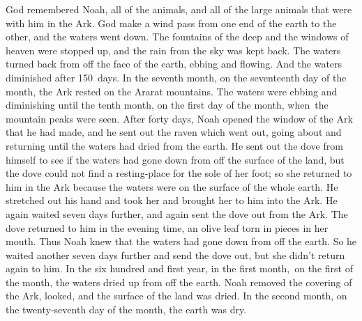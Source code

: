 
\begin{inparaenum}
   God remembered Noah, all of the animals, and all of the large animals that were with him in the Ark. God make a wind pass from one end of the earth to the other, and the waters went down.%
   The fountains of the deep and the windows of heaven were stopped up, and the rain from the sky was kept back.%
   The waters turned back from off the face of the earth, ebbing and flowing. And the waters diminished after 150~days.%
   In the seventh month, on the seventeenth day of the month, the Ark rested on the Ararat mountains.%
   The waters were ebbing and diminishing until the tenth month, on the first day of the month, when\understood\ the mountain peaks were seen.%
   After forty days, Noah opened the window of the Ark that he had made,%
   and he sent out the raven which went out, going about and returning until the waters had dried from the earth.%
   He sent out the dove from himself to see if the waters had gone down from off the surface of the land,%
   but the dove could not find a resting-place for the sole of her foot; so she returned to him in the Ark because the waters were on the surface of the whole earth. He stretched out his hand and took her and brought her to him into the Ark.%
   He again waited seven days further, and again sent the dove out from the Ark.%
   The dove returned to him in the evening time, an olive leaf torn in pieces in her mouth. Thus Noah knew that the waters had gone down from off the earth.%
   So he waited another seven days further and send the dove out, but she didn't return again to him.%
   In the six hundred and first year, in the first month,\understood\ on the first of the month, the waters dried up from off the earth. Noah removed the covering of the Ark, looked, and the surface of the land was dried.%
   In the second month, on the twenty-seventh day of the month, the earth was dry.%
  

\end{inparaenum}
